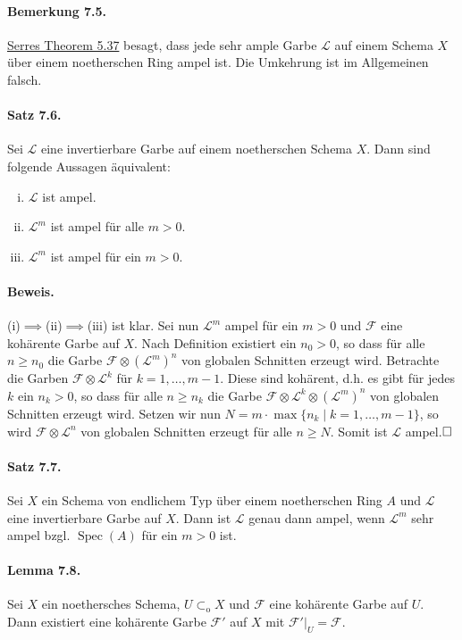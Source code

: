 \documentclass[11pt,b5paper,openany]{memoir}
\def \qed {$\hfill\square$}
\begin{document}
\paragraph{Bemerkung 7.5.}\label{7.5} \hyperref[5.37]{Serres Theorem 5.37} besagt, dass jede sehr ample Garbe $\mathcal{L}$ auf einem Schema $X$ über einem noetherschen Ring ampel ist. Die Umkehrung ist im Allgemeinen falsch.

\paragraph{Satz 7.6.}\label{7.6} Sei $\mathcal{L}$ eine invertierbare Garbe auf einem noetherschen Schema $X$. Dann sind folgende Aussagen äquivalent:
\begin{enumerate}[(i)]
\item $\mathcal{L}$ ist ampel.
\item $\mathcal{L}^m$ ist ampel für alle $m>0$.
\item $\mathcal{L}^m$ ist ampel für ein $m>0$.
\end{enumerate}

\paragraph{Beweis.} (i)$\implies$(ii)$\implies$(iii) ist klar. Sei nun $\mathcal{L}^m$ ampel für ein $m>0$ und $\mathcal{F}$ eine kohärente Garbe auf $X$. Nach Definition existiert ein $n_0>0$, so dass für alle $n\geq n_0$ die Garbe $\mathcal{F}\otimes(\mathcal{L}^m)^n$ von globalen Schnitten erzeugt wird. Betrachte die Garben $\mathcal{F}\otimes\mathcal{L}^k$ für $k=1,\ldots,m-1$. Diese sind kohärent, d.h. es gibt für jedes $k$ ein $n_k>0$, so dass für alle $n\geq n_k$ die Garbe $\mathcal{F}\otimes\mathcal{L}^k\otimes(\mathcal{L}^m)^n$ von globalen Schnitten erzeugt wird. Setzen wir nun $N=m\cdot\max\{n_k\mid k=1,\ldots,m-1\}$, so wird $\mathcal{F}\otimes\mathcal{L}^n$ von globalen Schnitten erzeugt für alle $n\geq N$. Somit ist $\mathcal{L}$ ampel.\qed

\paragraph{Satz 7.7.}\label{7.7} Sei $X$ ein Schema von endlichem Typ über einem noetherschen Ring $A$ und $\mathcal{L}$ eine invertierbare Garbe auf $X$. Dann ist $\mathcal{L}$ genau dann ampel, wenn $\mathcal{L}^m$ sehr ampel bzgl. $\operatorname{Spec}(A)$ für ein $m>0$ ist.

\paragraph{Lemma 7.8.}\label{7.8} Sei $X$ ein noethersches Schema, $U\subset_\text{o}X$ und $\mathcal{F}$ eine kohärente Garbe auf $U$. Dann existiert eine kohärente Garbe $\mathcal{F}'$ auf $X$ mit $\mathcal{F}'|_U=\mathcal{F}$.
\end{document}
